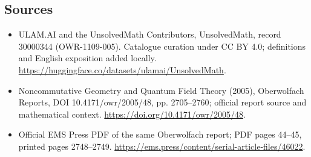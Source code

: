 \documentclass[11pt]{article}
\begin{document}
\subsection{Sources}
\begin{itemize}
\item[\hypertarget{source:30000344:1}{S1}] ULAM.AI and the UnsolvedMath Contributors, UnsolvedMath, record 30000344 (OWR-1109-005). Catalogue curation under CC BY 4.0; definitions and English exposition added locally.
\url{https://huggingface.co/datasets/ulamai/UnsolvedMath}.
\item[\hypertarget{source:30000344:2}{S2}] Noncommutative Geometry and Quantum Field Theory (2005), Oberwolfach Reports, DOI 10.4171/owr/2005/48, pp. 2705--2760; official report source and mathematical context.
\url{https://doi.org/10.4171/owr/2005/48}.
\item[\hypertarget{source:30000344:3}{S3}] Official EMS Press PDF of the same Oberwolfach report; PDF pages 44--45, printed pages 2748--2749.
\url{https://ems.press/content/serial-article-files/46022}.
\end{itemize}
\label{end:30000344}
\end{document}
